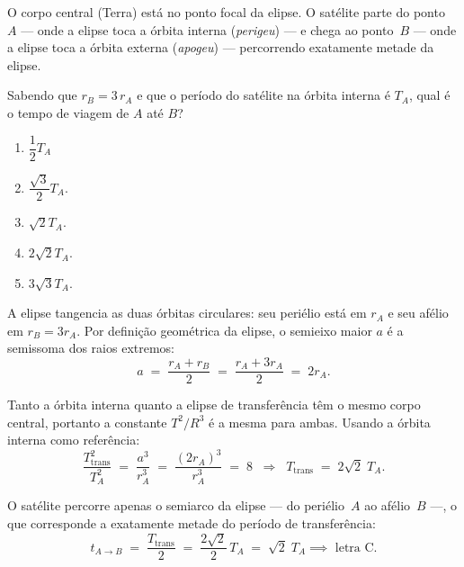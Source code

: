 \begin{exemplo}
O corpo central (Terra) está no ponto focal da elipse. O satélite parte
do ponto~$A$ — onde a elipse toca a órbita interna (\textit{perigeu})
— e chega ao ponto~$B$ — onde a elipse toca a órbita externa
(\textit{apogeu}) — percorrendo exatamente metade da elipse.

\medskip

Sabendo que $r_B = 3\,r_A$ e que o período do satélite na órbita
interna é $T_A$, qual é o tempo de viagem de $A$ até $B$?


\medskip

\begin{enumerate}
  \item [a)] $\dfrac{1}{2}T_A$
  \item [b)]$\dfrac{\sqrt{3}}{2}T_A.$
  \item [c)]$\sqrt{2}T_A.$
  \item [d)]$2\sqrt{2}T_A.$ 
  \item [e)]$3\sqrt{3}T_A.$ 
\end{enumerate}

\resolucao

A elipse tangencia as duas órbitas circulares: seu periélio está em
$r_A$ e seu afélio em $r_B = 3r_A$. Por definição geométrica da elipse,
o semieixo maior $a$ é a semissoma dos raios extremos:
%
\begin{equation}
  a \;=\; \frac{r_A + r_B}{2} \;=\; \frac{r_A + 3r_A}{2} \;=\; 2r_A. \nonumber
  \label{eq:semieixo-hoh}
\end{equation}


Tanto a órbita interna quanto a elipse de transferência têm o mesmo
corpo central, portanto a constante $T^2/R^3$ é a mesma para ambas.
Usando a órbita interna como referência:
%
\begin{equation}
  \frac{T_{\text{trans}}^2}{T_A^2}
  \;=\; \frac{a^3}{r_A^3}
  \;=\; \frac{(2r_A)^3}{r_A^3}
  \;=\; 8
  \;\;\Longrightarrow\;\;
  T_{\text{trans}} \;=\; 2\sqrt{2}\;T_A. \nonumber
  \label{eq:periodo-hoh}
\end{equation}

O satélite percorre apenas o semiarco da elipse — do periélio~$A$
ao afélio~$B$ —, o que corresponde a exatamente metade do período
de transferência:
%
\begin{equation}
  \boxed{t_{A \to B} 
  \;=\; \frac{T_{\text{trans}}}{2}
  \;=\; \frac{2\sqrt{2}}{2}\,T_A
  \;=\; \sqrt{2}\;T_A \implies \text{ letra C.}} \nonumber
  \label{eq:tempo-hoh}
\end{equation}



\end{exemplo}










